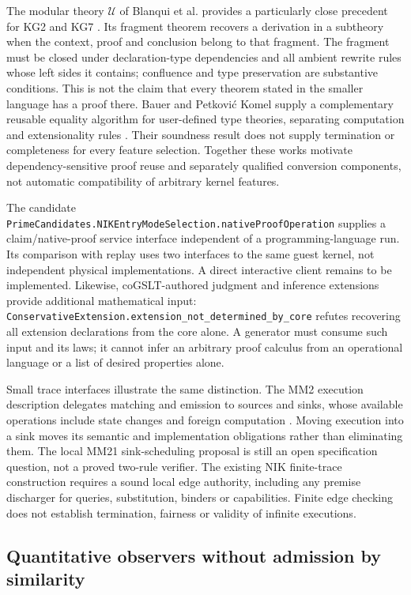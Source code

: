 \documentclass[11pt]{article}
\theoremstyle{definition}
\theoremstyle{remark}
\begin{document}
The modular theory $\mathcal U$ of Blanqui et al. provides a particularly close
precedent for KG2 and KG7 \cite{BlanquiModularTypeTheories}. Its fragment theorem
recovers a derivation in a subtheory when the context, proof and conclusion
belong to that fragment. The fragment must be closed under declaration-type
dependencies and all ambient rewrite rules whose left sides it contains;
confluence and type preservation are substantive conditions. This is not the
claim that every theorem stated in the smaller language has a proof there.
Bauer and Petkovi\'c Komel supply a complementary reusable equality algorithm
for user-defined type theories, separating computation and extensionality rules
\cite{BauerPetkovicEquality}. Their soundness result does not supply termination
or completeness for every feature selection. Together these works motivate
dependency-sensitive proof reuse and separately qualified conversion components,
not automatic compatibility of arbitrary kernel features.

The candidate \nolinkurl{PrimeCandidates.NIKEntryModeSelection.nativeProofOperation}
supplies a claim/native-proof service interface independent of a
programming-language run. Its comparison with replay uses two interfaces to
the same guest kernel, not independent physical implementations. A direct
interactive client remains to be implemented. Likewise, coGSLT-authored
judgment and inference extensions provide additional mathematical input:
\nolinkurl{ConservativeExtension.extension_not_determined_by_core} refutes
recovering all extension declarations from the core alone. A generator must
consume such input and its laws; it cannot infer an arbitrary proof calculus
from an operational language or a list of desired properties alone.

Small trace interfaces illustrate the same distinction. The MM2 execution
description delegates matching and emission to sources and sinks, whose
available operations include state changes and foreign computation
\cite{MORKMM2,MORKSourcesSinks}. Moving execution into a sink moves its semantic
and implementation obligations rather than eliminating them. The local MM21
sink-scheduling proposal is still an open specification question, not a proved
two-rule verifier. The existing NIK finite-trace construction requires a sound
local edge authority, including any premise discharger for queries,
substitution, binders or capabilities. Finite edge checking does not establish
termination, fairness or validity of infinite executions.

\subsection{Quantitative observers without admission by similarity}
\label{sec:distinction-calculus}
\end{document}
